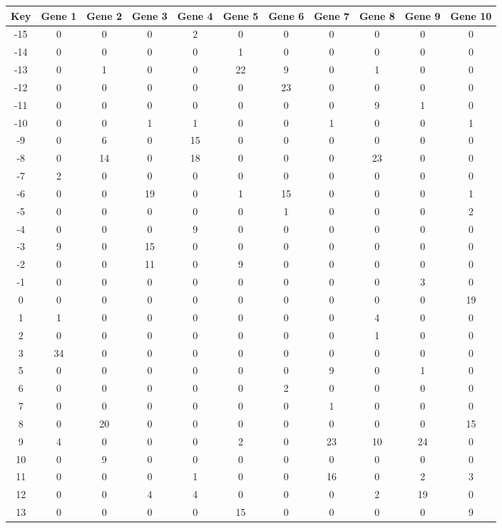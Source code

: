 \begin{tabular}{|c|c|c|c|c|c|c|c|c|c|c|}
\hline
Key & Gene 1 & Gene 2 & Gene 3 & Gene 4 & Gene 5 & Gene 6 & Gene 7 & Gene 8 & Gene 9 & Gene 10 \\
\hline
-15 & 0 & 0 & 0 & 2 & 0 & 0 & 0 & 0 & 0 & 0 \\
-14 & 0 & 0 & 0 & 0 & 1 & 0 & 0 & 0 & 0 & 0 \\
-13 & 0 & 1 & 0 & 0 & 22 & 9 & 0 & 1 & 0 & 0 \\
-12 & 0 & 0 & 0 & 0 & 0 & 23 & 0 & 0 & 0 & 0 \\
-11 & 0 & 0 & 0 & 0 & 0 & 0 & 0 & 9 & 1 & 0 \\
-10 & 0 & 0 & 1 & 1 & 0 & 0 & 1 & 0 & 0 & 1 \\
-9 & 0 & 6 & 0 & 15 & 0 & 0 & 0 & 0 & 0 & 0 \\
-8 & 0 & 14 & 0 & 18 & 0 & 0 & 0 & 23 & 0 & 0 \\
-7 & 2 & 0 & 0 & 0 & 0 & 0 & 0 & 0 & 0 & 0 \\
-6 & 0 & 0 & 19 & 0 & 1 & 15 & 0 & 0 & 0 & 1 \\
-5 & 0 & 0 & 0 & 0 & 0 & 1 & 0 & 0 & 0 & 2 \\
-4 & 0 & 0 & 0 & 9 & 0 & 0 & 0 & 0 & 0 & 0 \\
-3 & 9 & 0 & 15 & 0 & 0 & 0 & 0 & 0 & 0 & 0 \\
-2 & 0 & 0 & 11 & 0 & 9 & 0 & 0 & 0 & 0 & 0 \\
-1 & 0 & 0 & 0 & 0 & 0 & 0 & 0 & 0 & 3 & 0 \\
0 & 0 & 0 & 0 & 0 & 0 & 0 & 0 & 0 & 0 & 19 \\
1 & 1 & 0 & 0 & 0 & 0 & 0 & 0 & 4 & 0 & 0 \\
2 & 0 & 0 & 0 & 0 & 0 & 0 & 0 & 1 & 0 & 0 \\
3 & 34 & 0 & 0 & 0 & 0 & 0 & 0 & 0 & 0 & 0 \\
5 & 0 & 0 & 0 & 0 & 0 & 0 & 9 & 0 & 1 & 0 \\
6 & 0 & 0 & 0 & 0 & 0 & 2 & 0 & 0 & 0 & 0 \\
7 & 0 & 0 & 0 & 0 & 0 & 0 & 1 & 0 & 0 & 0 \\
8 & 0 & 20 & 0 & 0 & 0 & 0 & 0 & 0 & 0 & 15 \\
9 & 4 & 0 & 0 & 0 & 2 & 0 & 23 & 10 & 24 & 0 \\
10 & 0 & 9 & 0 & 0 & 0 & 0 & 0 & 0 & 0 & 0 \\
11 & 0 & 0 & 0 & 1 & 0 & 0 & 16 & 0 & 2 & 3 \\
12 & 0 & 0 & 4 & 4 & 0 & 0 & 0 & 2 & 19 & 0 \\
13 & 0 & 0 & 0 & 0 & 15 & 0 & 0 & 0 & 0 & 9 \\
\hline
\end{tabular}